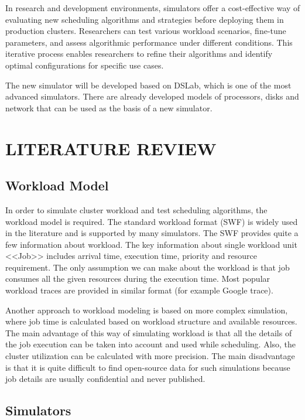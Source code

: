 \documentclass[a4paper,10pt]{article}
\begin{document}
\begin{multicols*}{2}
In research and development environments, simulators offer a cost-effective way of evaluating new scheduling algorithms and strategies before deploying them in production clusters. Researchers can test various workload scenarios, fine-tune parameters, and assess algorithmic performance under different conditions. This iterative process enables researchers to refine their algorithms and identify optimal configurations for specific use cases.

The new simulator will be developed based on DSLab\cite{dslab-repo}, which is one of the most advanced simulators\cite{dslab-architecture}\cite{dslab-analog-cmp}. There are already developed models of processors, disks and network that can be used as the basis of a new simulator.

\section{{\normalsize L}ITERATURE {\normalsize R}EVIEW}

\subsection{Workload Model}

In order to simulate cluster workload and test scheduling algorithms, the workload model is required. The standard workload format (SWF)\cite{standard-workload-format} is widely used in the literature and is supported by many simulators. The SWF provides quite a few information about workload. The key information about single workload unit <<Job>> includes arrival time, execution time, priority and resource requirement. The only assumption we can make about the workload is that job consumes all the given resources during the execution time. Most popular workload traces are provided in similar format (for example Google trace\cite{google-clusterdata}).  

Another approach to workload modeling is based on more complex simulation, where job time is calculated based on workload structure and available resources. The main advantage of this way of simulating workload is that all the details of the job execution can be taken into account and used while scheduling. Also, the cluster utilization can be calculated with more precision. The main disadvantage is that it is quite difficult to find open-source data for such simulations because job details are usually confidential and never published. 

\subsection{Simulators}


\end{multicols*}
\end{document}
